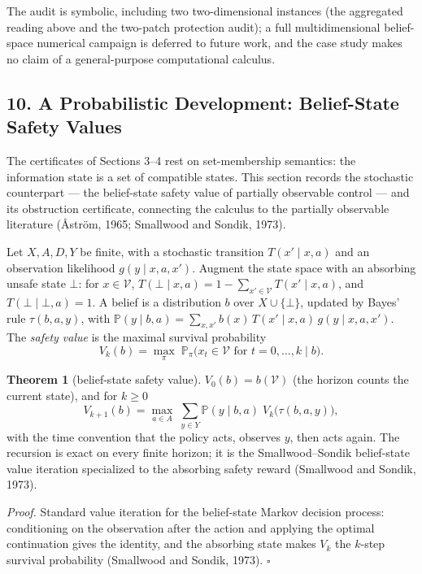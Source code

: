 \documentclass[10pt,twocolumn]{article}
\theoremstyle{definition}
\newtheorem{theorem}{Theorem}
\begin{document}
The audit is symbolic, including two two-dimensional instances
(the aggregated reading above and the two-patch protection audit); a full
multidimensional belief-space numerical campaign is deferred to future work,
and the case study makes no claim of a general-purpose computational calculus.

\subsection{10. A Probabilistic Development: Belief-State Safety Values}\label{calc-probabilistic-development}

The certificates of Sections 3--4 rest on set-membership semantics: the information state is a set of compatible states. This section records the stochastic counterpart --- the belief-state safety value of partially observable control --- and its obstruction certificate, connecting the calculus to the partially observable literature (\r{A}str\"om, 1965; Smallwood and Sondik, 1973).

Let \(X, A, D, Y\) be finite, with a stochastic transition \(T(x' \mid x, a)\) and an observation likelihood \(g(y \mid x, a, x')\). Augment the state space with an absorbing unsafe state \(\bot\): for \(x \in \mathcal{V}\), \(T(\bot \mid x, a) = 1 - \sum_{x' \in \mathcal{V}} T(x' \mid x, a)\), and \(T(\bot \mid \bot, a) = 1\). A belief is a distribution \(b\) over \(X \cup \{\bot\}\), updated by Bayes' rule \(\tau(b, a, y)\), with \(\mathbb{P}(y \mid b, a) = \sum_{x, x'} b(x)\, T(x' \mid x, a)\, g(y \mid x, a, x')\). The \emph{safety value} is the maximal survival probability
\[
V_{k}(b) = \max_{\pi}\; \mathbb{P}_{\pi}\bigl( x_{t} \in \mathcal{V} \text{ for } t = 0, \dots, k \;\big|\; b \bigr).
\]

\begin{theorem}[belief-state safety value]\label{calc-thm:pomdp}
\(V_{0}(b) = b(\mathcal{V})\) (the horizon counts the current state), and for \(k \ge 0\)
\[
V_{k+1}(b) = \max_{a \in A}\; \sum_{y \in Y} \mathbb{P}(y \mid b, a)\; V_{k}\bigl(\tau(b, a, y)\bigr),
\]
with the time convention that the policy acts, observes \(y\), then acts again. The recursion is exact on every finite horizon; it is the Smallwood--Sondik belief-state value iteration specialized to the absorbing safety reward (Smallwood and Sondik, 1973).
\end{theorem}

\emph{Proof.} Standard value iteration for the belief-state Markov decision process: conditioning on the observation after the action and applying the optimal continuation gives the identity, and the absorbing state makes \(V_{k}\) the \(k\)-step survival probability (Smallwood and Sondik, 1973). \hfill\(\square\)
\end{document}
